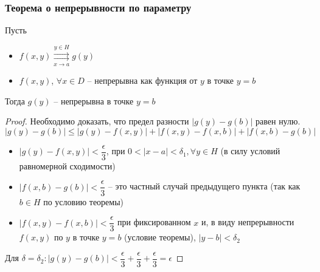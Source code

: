 \subsubsection{Теорема о непрерывности по параметру}
\begin{theorem*}
    Пусть
    \begin{itemize}
        \item $f(x, y) \overset{y \in H}{\underset{x \to a}{\rightrightarrows}} g(y)$
        \item $f(x, y)$, $\forall x \in D$ -- непрерывна как функция от $y$ в точке $y = b$
    \end{itemize}
    Тогда $g(y)$ -- непрерывна в точке $y = b$
\end{theorem*}
\begin{proof}
    Необходимо доказать, что предел разности $|g(y) - g(b)|$ равен нулю. \\ 
    $|g(y) - g(b)| \leqslant |g(y) - f(x, y)| + |f(x, y) - f(x, b)| + |f(x, b) - g(b)|$
    \begin{itemize}
        \item $|g(y) - f(x, y)| < \dfrac{\epsilon}{3}$, при $0 < |x - a| < \delta_1, \forall y \in H$ 
        (в силу условий равномерной сходимости)
        \item $|f(x, b) - g(b)| < \dfrac{\epsilon}{3}$ -- это частный случай предыдущего 
        пункта (так как $b \in H$ по условию теоремы)
        \item $|f(x, y) - f(x, b)| < \dfrac{\epsilon}{3}$ при фиксированном $x$ и, в виду непрерывности
        $f(x, y)$ по $y$ в точке $y = b$ (условие теоремы), $|y - b| < \delta_2$
    \end{itemize}
    Для $\delta = \delta_2: |g(y) - g(b)| < \dfrac{\epsilon}{3} + 
    \dfrac{\epsilon}{3} +  \dfrac{\epsilon}{3} = \epsilon$
\end{proof}


